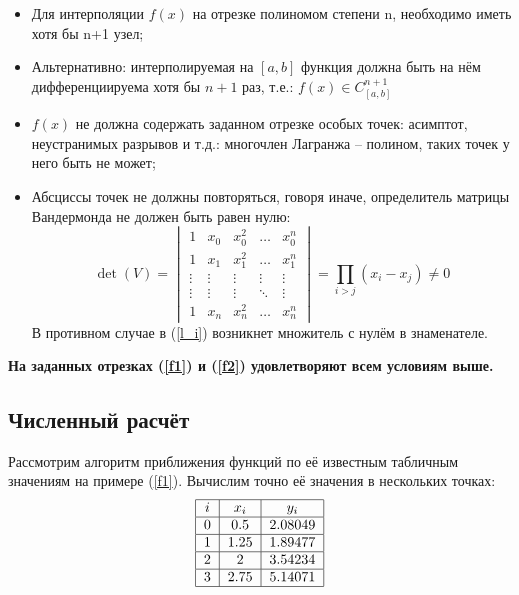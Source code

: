 \begin{itemize}
    \item Для интерполяции $f(x)$ на отрезке полиномом степени n, необходимо иметь хотя бы n+1 узел;
    \item Альтернативно: интерполируемая на $[a,b]$ функция должна быть на нём дифференциируема хотя бы $n+1$ раз, т.е.: $f(x)\in C^{n+1}_{[a,b]}$
    \item $f(x)$ не должна содержать заданном отрезке особых точек: асимптот, неустранимых разрывов и т.д.: многочлен Лагранжа -- полином, таких точек у него быть не может;
    \item Абсциссы точек не должны повторяться, говоря иначе, определитель матрицы Вандермонда не должен быть равен нулю:
    \begin{equation}
        \det(V) =
        \begin{vmatrix}
            1 & x_0 & x_0^2 & \hdots & x_0^n \\
            1 & x_1 & x_1^2 & \hdots & x_1^n \\
            \vdots & \vdots & \vdots & \vdots & \vdots \\
            \vdots & \vdots & \vdots & \ddots & \vdots \\
            1 & x_n & x_n^2 & \hdots & x_n^n
        \end{vmatrix} =
        \prod_{i>j}{(x_i-x_j)} \ne 0
    \end{equation}
    В противном случае в (\ref{l_i}) возникнет множитель с нулём в знаменателе.
\end{itemize}

{\bf На заданных отрезках (\ref{f1}) и (\ref{f2}) удовлетворяют всем условиям выше.}

\subsection{Численный расчёт}

Рассмотрим алгоритм приближения функций по её известным табличным значениям на примере (\ref{f1}). Вычислим точно её значения в нескольких точках:
\begin{align}
    \label{4nodes_f1}
    \begin{tabular}{|c|c|c|}
        \hline
        $i$ & $x_i$ & $y_i$ \\
        \hline
        0 & 0.5 & 2.08049 \\
        \hline
        1 & 1.25 & 1.89477 \\
        \hline
        2 & 2 & 3.54234 \\
        \hline
        3 & 2.75 & 5.14071 \\
        \hline
    \end{tabular}
\end{align}

